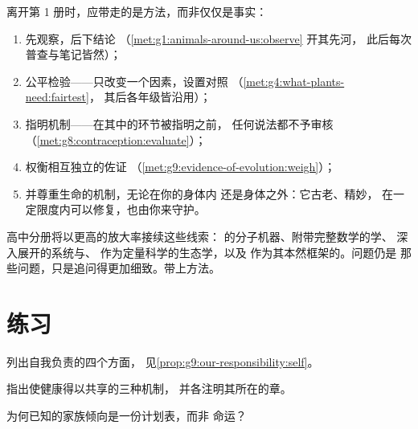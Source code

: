 \begin{method}[毕业生的方法]\label{met:g9:our-responsibility:method}
离开第 1 册时，应带走的是方法，而非仅仅是事实：
\begin{enumerate}
  \item 先观察，后下结论
        （\cref{met:g1:animals-around-us:observe} 开其先河，
        此后每次普查与笔记皆然）；
  \item 公平检验——只改变一个因素，设置对照
        （\cref{met:g4:what-plants-need:fairtest}，
        其后各年级皆沿用）；
  \item 指明机制——在其中的环节被指明之前，
        任何说法都不予审核
        （\cref{met:g8:contraception:evaluate}）；
  \item 权衡相互独立的佐证
        （\cref{met:g9:evidence-of-evolution:weigh}）；
  \item 并尊重生命的机制，无论在你的身体内
        还是身体之外：它古老、精妙，
        在一定限度内可以修复，也由你来守护。
\end{enumerate}
\end{method}

\begin{remark}[接下来的内容]\label{rem:g9:our-responsibility:next}
高中分册将以更高的放大率接续这些线索：
的分子机器、附带完整数学的学、
深入展开的系统与、
作为定量科学的生态学，以及
作为其本然框架的。问题仍是
那些问题，只是追问得更加细致。带上方法。
\end{remark}

\section{练习}

\begin{exercise}[$\star$]\label{exo:g9:our-responsibility:1}
列出自我负责的四个方面，
见\cref{prop:g9:our-responsibility:self}。
\end{exercise}

\begin{exercise}[$\star$]\label{exo:g9:our-responsibility:2}
指出使健康得以共享的三种机制，
并各注明其所在的章。
\end{exercise}

\begin{exercise}[$\star$]\label{exo:g9:our-responsibility:3}
为何已知的家族倾向是一份计划表，而非
命运？
\end{exercise}

